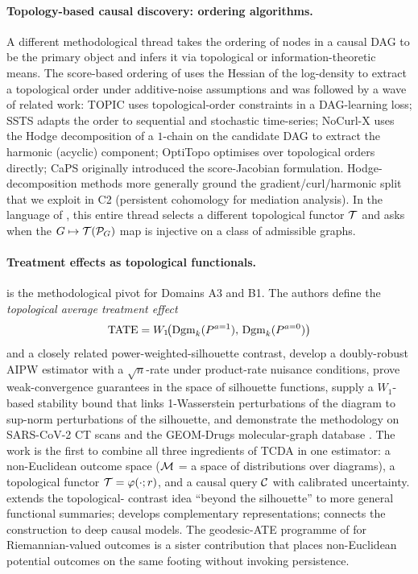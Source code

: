 \paragraph{Topology-based causal discovery: ordering algorithms.}
A different methodological thread takes the ordering of nodes in a
causal DAG to be the primary object and infers it via topological or
information-theoretic means. The score-based ordering of
\citet{rolland2022score} uses the Hessian of the log-density to
extract a topological order under additive-noise assumptions and was
followed by a wave of related work: TOPIC
\citep{tran2024constraining} uses topological-order constraints in a
DAG-learning loss; SSTS \citep{xu2025information} adapts the order to
sequential and stochastic time-series; NoCurl-X
\citep{nocurl2024} uses the Hodge decomposition of a $1$-chain on the
candidate DAG to extract the harmonic (acyclic) component; OptiTopo
\citep{wu2026optimization} optimises over topological orders directly;
CaPS \citep{rolland2022score} originally introduced the score-Jacobian
formulation. Hodge-decomposition methods more generally
\citep{desilva2007coverage} ground the gradient/curl/harmonic split
that we exploit in C2 (persistent cohomology for mediation analysis).
In the language of , this entire thread
selects a different topological functor $\mathcal{T}$ and asks when the
$G \mapsto \mathcal{T}(\mathcal{P}_G)$ map is injective on a class of admissible
graphs.

\paragraph{Treatment effects as topological functionals.}
\citet{kim2026topological} is the methodological pivot for Domains A3
and B1. The authors define the \emph{topological average treatment
effect}
\[
  \operatorname{TATE} = W_1\!\bigl(\mathrm{Dgm}_{k}(P^{a=1}),\,\mathrm{Dgm}_{k}(P^{a=0})\bigr)
\]
and a closely related power-weighted-silhouette contrast, develop a
doubly-robust AIPW estimator with a $\sqrt n$-rate under product-rate
nuisance conditions, prove weak-convergence guarantees in the space of
silhouette functions, supply a $W_1$-based stability bound that links
1-Wasserstein perturbations of the diagram to sup-norm perturbations
of the silhouette, and demonstrate the methodology on SARS-CoV-2 CT
scans \citep{soares2020sars} and the GEOM-Drugs molecular-graph
database \citep{axelrod2022geom}. The work is the first to combine all
three ingredients of TCDA in one estimator: a non-Euclidean outcome
space ($\mathcal{M}$ = a space of distributions over diagrams), a topological
functor $\mathcal{T} = \varphi(\cdot;r)$, and a causal query $\mathcal{C}$ with
calibrated uncertainty. \citet{saki2026beyond} extends the topological-
contrast idea ``beyond the silhouette'' to more general functional
summaries; \citet{ballester2026topological} develops complementary
representations; \citet{deepcausalitytopology2026} connects the
construction to deep causal models. The geodesic-ATE programme of
\citet{kurisu2024geodesic} for Riemannian-valued outcomes is a sister
contribution that places non-Euclidean potential outcomes on the same
footing without invoking persistence.

